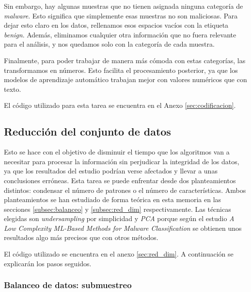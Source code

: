 \vspace{1em}

Sin embargo, hay algunas muestras que no tienen asignada ninguna categoría de \textit{malware}. Esto significa que simplemente esas muestras no son maliciosas. Para dejar esto claro en los datos, rellenamos esos espacios vacíos con la etiqueta \textit{benign}. Además, eliminamos cualquier otra información que no fuera relevante para el análisis, y nos quedamos solo con la categoría de cada muestra.

\vspace{1em}

Finalmente, para poder trabajar de manera más cómoda con estas categorías, las transformamos en números. Esto facilita el procesamiento posterior, ya que los modelos de aprendizaje automático trabajan mejor con valores numéricos que con texto.

\vspace{1em}

El código utilizado para esta tarea se encuentra en el Anexo \ref{sec:codificacion}.

\subsection{Reducción del conjunto de datos}
\label{subsec:red_dataset}

Esto se hace con el objetivo de disminuir el tiempo que los algoritmos van a necesitar para procesar la información sin perjudicar la integridad de los datos, ya que los resultados del estudio podrían verse afectados y llevar a unas conclusiones erróneas. Esta tarea se puede enfrentar desde dos planteamientos distintos: condensar el número de patrones o el número de características. Ambos planteamientos se han estudiado de forma teórica en esta memoria en las secciones \ref{subsec:balanceo} y \ref{subsec:red_dim} respectivamente. Las técnicas elegidas son \textit{undersampling} por simplicidad y \textit{PCA} porque según el estudio \textit{A Low Complexity ML-Based Methods for Malware Classification} \cite{red_dim_pca} se obtienen unos resultados algo más precisos que con otros métodos.

\vspace{1em}

El código utilizado se encuentra en el anexo \ref{sec:red_dim}. A continuación se explicarán los pasos seguidos.

\subsubsection{Balanceo de datos: submuestreo}
\label{subsubsec:num_patrones}

